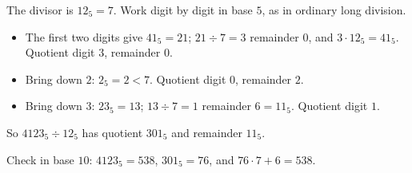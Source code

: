 The divisor is $12_5=7$. Work digit by digit in base $5$, as in ordinary long division.
\begin{itemize}
\item The first two digits give $41_5=21$; $21\div7=3$ remainder $0$, and $3\cdot12_5=41_5$. Quotient digit $3$, remainder $0$.
\item Bring down $2$: $2_5=2<7$. Quotient digit $0$, remainder $2$.
\item Bring down $3$: $23_5=13$; $13\div7=1$ remainder $6=11_5$. Quotient digit $1$.
\end{itemize}
So $4123_5\div12_5$ has quotient $\boxed{301_5}$ and remainder $\boxed{11_5}$.

Check in base $10$: $4123_5=538$, $301_5=76$, and $76\cdot7+6=538$.
